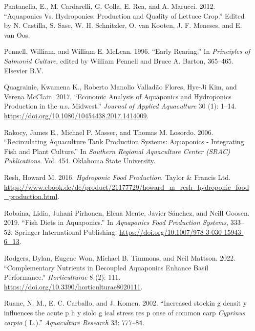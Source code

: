 \documentclass[
]{article}
\newlength{\cslhangindent}
\newlength{\cslentryspacingunit} %
\newenvironment{CSLReferences}[2] %
 {%
  \setlength{\parindent}{0pt}
  \ifodd #1
  \let\oldpar\par
  \def\par{\hangindent=\cslhangindent\oldpar}
  \fi
  \setlength{\parskip}{#2\cslentryspacingunit}
 }%
 {}
\begin{document}
\begin{CSLReferences}{1}{0}
\leavevmode{}%
Pantanella, E., M. Cardarelli, G. Colla, E. Rea, and A. Marucci. 2012. {``Aquaponics Vs. Hydroponics: Production and Quality of Lettuce Crop.''} Edited by N. Castilla, S. Sase, W. H. Schnitzler, O. van Kooten, J. F. Meneses, and E. van Oos.

\leavevmode{}%
Pennell, William, and William E. McLean. 1996. {``Early Rearing.''} In \emph{Principles of Salmonid Culture}, edited by William Pennell and Bruce A. Barton, 365--465. Elsevier B.V.

\leavevmode{}%
Quagrainie, Kwamena K., Roberto Manolio Valladão Flores, Hye-Ji Kim, and Verena McClain. 2017. {``Economic Analysis of Aquaponics and Hydroponics Production in the u.s. Midwest.''} \emph{Journal of Applied Aquaculture} 30 (1): 1--14. \url{https://doi.org/10.1080/10454438.2017.1414009}.

\leavevmode{}%
Rakocy, James E., Michael P. Masser, and Thomas M. Losordo. 2006. {``Recirculating Aquaculture Tank Production Systems: Aquaponics - Integrating Fish and Plant Culture.''} In \emph{Southern Regional Aquaculture Center (SRAC) Publications}. Vol. 454. Oklahoma State University.

\leavevmode{}%
Resh, Howard M. 2016. \emph{{Hydroponic Food Production}}. Taylor \& Francis Ltd. \url{https://www.ebook.de/de/product/21177729/howard_m_resh_hydroponic_food_production.html}.

\leavevmode{}%
Robaina, Lidia, Juhani Pirhonen, Elena Mente, Javier Sánchez, and Neill Goosen. 2019. {``{Fish Diets in Aquaponics}.''} In \emph{Aquaponics Food Production Systems}, 333--52. Springer International Publishing. \url{https://doi.org/10.1007/978-3-030-15943-6_13}.

\leavevmode{}%
Rodgers, Dylan, Eugene Won, Michael B. Timmons, and Neil Mattson. 2022. {``Complementary Nutrients in Decoupled Aquaponics Enhance Basil Performance.''} \emph{Horticulturae} 8 (2): 111. \url{https://doi.org/10.3390/horticulturae8020111}.

\leavevmode{}%
Ruane, N. M., E. C. Carballo, and J. Komen. 2002. {``{Increased stockin g densit y influences the acute p h y siolo g ical stress res p onse of common carp \emph{Cyprinus carpio} ( L.)}.''} \emph{Aquaculture Research} 33: 777--84.


\end{CSLReferences}
\end{document}
